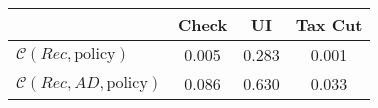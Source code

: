 \begin{tabular}{@{}lccc@{}}
\toprule
                          & Check      & UI    & Tax Cut    \\  \midrule
$\mathcal{C}(Rec,\text{policy})$ & 0.005  & 0.283  & 0.001     \\
$\mathcal{C}(Rec, AD,\text{policy})$ & 0.086  & 0.630  & 0.033     \\
\end{tabular}
